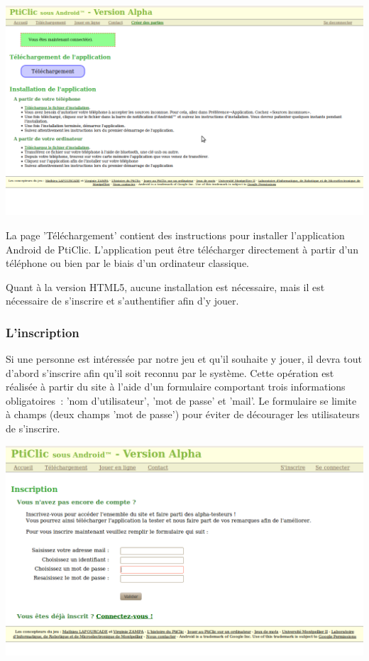 \documentclass[a4paper,11pt,french]{article}
\begin{document}
\begin{center}
\includegraphics[width=14cm]{img/siteTelechargement.png}
\end{center}

La page 'Téléchargement' contient des instructions pour installer l'application Android de PtiClic. L'application peut être télécharger directement à partir d'un téléphone ou bien par le biais d'un ordinateur classique. 

Quant à la version HTML5, aucune installation est nécessaire, mais il est nécessaire de s'inscrire et s'authentifier afin d'y jouer. 

\subsubsection{L'inscription}
Si une personne est intéressée par notre jeu et qu'il souhaite y jouer, il devra tout d'abord s'inscrire afin qu'il
soit reconnu par le système. Cette opération est réalisée à partir du site à l'aide d'un formulaire comportant
trois informations obligatoires~: 'nom d'utilisateur', 'mot de passe' et 'mail'. Le formulaire se limite à champs (deux champs 'mot de passe') pour éviter de décourager les utilisateurs de s'inscrire.

\begin{center}
\includegraphics[width=14cm]{img/siteInscription.png}
\end{center}
\end{document}
